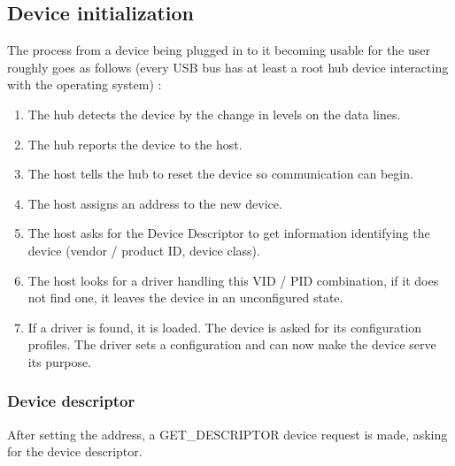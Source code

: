 \documentclass{article}
\begin{document}
\subsection{Device initialization}

The process from a device being plugged in to it becoming usable for the user
roughly goes as follows (every USB bus has at least a root hub device interacting with
the operating system) \cite[p. 87ff.]{uc}:

\begin{enumerate}
  \item The hub detects the device by the change in levels on the data lines.
  \item The hub reports the device to the host.
  \item The host tells the hub to reset the device so communication can begin.
  \item The host assigns an address to the new device.
  \item The host asks for the Device Descriptor to get information identifying the device
        (vendor / product ID, device class).
  \item The host looks for a driver handling this VID / PID combination, if it does not find one,
        it leaves the device in an unconfigured state.
  \item If a driver is found, it is loaded. The device is asked for its configuration profiles.
        The driver sets a configuration and can now make the device serve its purpose.
\end{enumerate}

\subsubsection{Device descriptor}

After setting the address, a GET\_DESCRIPTOR
device request is made, asking for the device descriptor.
\end{document}
